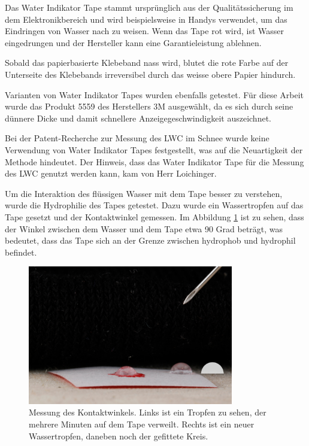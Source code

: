 Das Water Indikator Tape stammt ursprünglich aus der Qualitätssicherung im dem Elektronikbereich und wird beispielsweise in Handys verwendet, um das Eindringen von Wasser nach zu weisen. Wenn das Tape rot wird, ist Wasser eingedrungen und der Hersteller kann eine Garantieleistung ablehnen.

Sobald das papierbasierte Klebeband nass wird, blutet die rote Farbe auf der Unterseite des Klebebands irreversibel durch das weisse obere Papier hindurch.

 Varianten von Water Indikator Tapes wurden ebenfalls getestet. Für diese Arbeit wurde das Produkt 5559 des Herstellers 3M ausgewählt, da es sich durch seine dünnere Dicke und damit schnellere Anzeigegeschwindigkeit auszeichnet.

Bei der Patent-Recherche zur Messung des LWC im Schnee wurde keine Verwendung von Water Indikator Tapes festgestellt, was auf die Neuartigkeit der Methode hindeutet. Der Hinweis, dass das Water Indikator Tape für die Messung des LWC genutzt werden kann, kam von Herr Loichinger.

Um die Interaktion des flüssigen Wasser mit dem Tape besser zu verstehen, wurde die Hydrophilie des Tapes getestet. Dazu wurde ein Wassertropfen auf das Tape gesetzt und der Kontaktwinkel gemessen. Im Abbildung \ref{fig:winkTropf} ist zu sehen, dass der Winkel zwischen dem Wasser und dem Tape etwa 90 Grad beträgt, was bedeutet, dass das Tape sich an der Grenze zwischen hydrophob und hydrophil befindet.

\begin{figure}
    \centering
    \includegraphics[width=0.8\textwidth]{Bilder/IMG_6683.JPG}
    \caption{Messung des Kontaktwinkels. Links ist ein Tropfen zu sehen, der mehrere Minuten auf dem Tape verweilt. Rechts ist ein neuer Wassertropfen, daneben noch der gefittete Kreis.} 
    \label{fig:winkTropf}
\end{figure}

